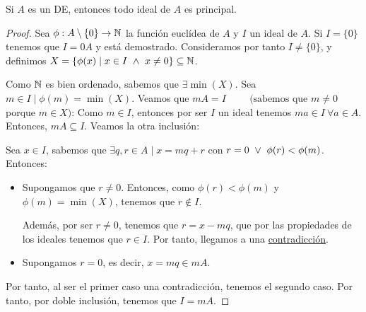 \begin{teo}
    \label{teo:TodoIdealPrincipalDE}
    Si $A$ es un DE, entonces todo ideal de $A$ es principal.
\end{teo}
\begin{proof}
    Sea $\phi:A\setminus\{0\}\rightarrow\mathbb N$ la función euclídea de $A$ y $I$ un ideal de $A$. Si $I=\{0\}$ tenemos que $I = 0A$ y está demostrado. Consideramos por tanto $I \neq \{0\}$, y definimos $X = \{\phi(x) \mid x \in I \ \land \  x \neq 0\} \subseteq \mathbb N$.
    
    Como $\mathbb N$ es bien ordenado, sabemos que $\exists \min(X)$. Sea $m \in I \mid \phi(m) = \min(X)$. Veamos que $mA = I\hspace{1cm} (\mbox{sabemos que } m\neq 0$ porque $m\in X)$:\newline
    Como $m \in I$, entonces por ser $I$ un ideal tenemos $ma \in I ~\forall a \in A$. Entonces, $mA \subseteq I$. Veamos la otra inclusión:
    
    Sea $x \in I$, sabemos que $ \exists q,r \in A \mid x=mq+r$ con $r=0 \ \lor \  \phi(r) < \phi(m)$. Entonces:
    \begin{itemize}
        \item Supongamos que $\displaystyle r\neq 0$. Entonces, como $\phi(r) < \phi(m)$ y $\phi(m) = \min(X)$, tenemos que $r\notin I$.

        Además, por ser $r\neq 0$, tenemos que $r=x-mq$, que por las propiedades de los ideales tenemos que $r\in I$. Por tanto, llegamos a una \ul{contradicción}.
        
        \item Supongamos $r=0$, es decir, $x=mq\in mA$.
    \end{itemize}

    Por tanto, al ser el primer caso una contradicción, tenemos el segundo caso. Por tanto, por doble inclusión, tenemos que $I=mA$.
\end{proof}

